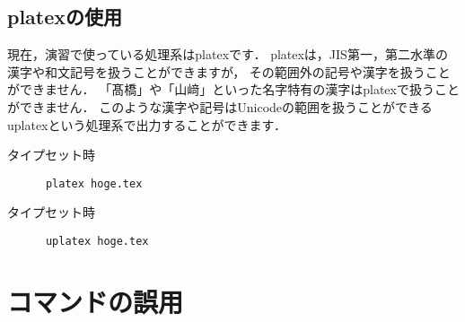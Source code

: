 \documentclass[dvipdfmx,uplatex]{jsarticle}
\begin{document}
\subsection{platexの使用}
現在，演習で使っている処理系はplatexです．
platexは，JIS第一，第二水準の漢字や和文記号を扱うことができますが，
その範囲外の記号や漢字を扱うことができません．
「髙橋」や「山﨑」といった名字特有の漢字はplatexで扱うことができません．
このような漢字や記号はUnicodeの範囲を扱うことができるuplatexという処理系で出力することができます．
\begin{tcolorbox}[title=特殊な文字や記号の出力]
  \begin{tcolorbox}[title=platex, colframe=wrongcolor]
    タイプセット時
    \begin{verbatim}
      platex hoge.tex
    \end{verbatim}
  \end{tcolorbox}
  \begin{tcolorbox}[title=uplatex, colframe=correctcolor]
    タイプセット時
    \begin{verbatim}
      uplatex hoge.tex
    \end{verbatim}
  \end{tcolorbox}
\end{tcolorbox}

\section{コマンドの誤用}
\end{document}
